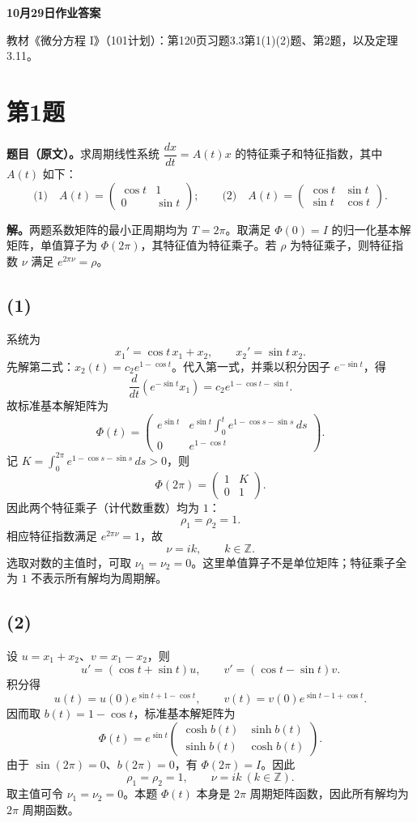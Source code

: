 \documentclass[11pt,a4paper]{ctexart}
\begin{document}
\begin{center}\LARGE\bfseries 10月29日作业答案\end{center}
教材《微分方程 I》（101计划）：第120页习题3.3第1(1)(2)题、第2题，以及定理3.11。

\section*{第1题}
\textbf{题目（原文）。}求周期线性系统 $\dfrac{dx}{dt}=A(t)x$ 的特征乘子和特征指数，其中 $A(t)$ 如下：
\[
\text{(1)}\quad A(t)=\begin{pmatrix}\cos t&1\\0&\sin t\end{pmatrix};
\qquad
\text{(2)}\quad A(t)=\begin{pmatrix}\cos t&\sin t\\\sin t&\cos t\end{pmatrix}.
\]

\textbf{解。}两题系数矩阵的最小正周期均为 $T=2\pi$。取满足 $\Phi(0)=I$ 的归一化基本解矩阵，单值算子为 $\Phi(2\pi)$，其特征值为特征乘子。若 $\rho$ 为特征乘子，则特征指数 $\nu$ 满足 $e^{2\pi\nu}=\rho$。

\subsection*{(1)}
系统为
\[
x_1'=\cos t\,x_1+x_2,\qquad x_2'=\sin t\,x_2.
\]
先解第二式：$x_2(t)=c_2e^{1-\cos t}$。代入第一式，并乘以积分因子 $e^{-\sin t}$，得
\[
\frac{d}{dt}(e^{-\sin t}x_1)
=c_2e^{1-\cos t-\sin t}.
\]
故标准基本解矩阵为
\[
\Phi(t)=\begin{pmatrix}
e^{\sin t}&e^{\sin t}\displaystyle\int_0^t e^{1-\cos s-\sin s}\,ds\\
0&e^{1-\cos t}
\end{pmatrix}.
\]
记 $K=\displaystyle\int_0^{2\pi}e^{1-\cos s-\sin s}\,ds>0$，则
\[
\Phi(2\pi)=\begin{pmatrix}1&K\\0&1\end{pmatrix}.
\]
因此两个特征乘子（计代数重数）均为 $1$：
\[
\boxed{\rho_1=\rho_2=1.}
\]
相应特征指数满足 $e^{2\pi\nu}=1$，故
\[
\boxed{\nu=ik,\qquad k\in\mathbb Z.}
\]
选取对数的主值时，可取 $\nu_1=\nu_2=0$。这里单值算子不是单位矩阵；特征乘子全为 $1$ 不表示所有解均为周期解。

\subsection*{(2)}
设 $u=x_1+x_2$、$v=x_1-x_2$，则
\[
u'=(\cos t+\sin t)u,\qquad v'=(\cos t-\sin t)v.
\]
积分得
\[
u(t)=u(0)e^{\sin t+1-\cos t},\qquad
v(t)=v(0)e^{\sin t-1+\cos t}.
\]
因而取 $b(t)=1-\cos t$，标准基本解矩阵为
\[
\Phi(t)=e^{\sin t}\begin{pmatrix}
\cosh b(t)&\sinh b(t)\\
\sinh b(t)&\cosh b(t)
\end{pmatrix}.
\]
由于 $\sin(2\pi)=0$、$b(2\pi)=0$，有 $\Phi(2\pi)=I$。因此
\[
\boxed{\rho_1=\rho_2=1,\qquad \nu=ik\ (k\in\mathbb Z).}
\]
取主值可令 $\nu_1=\nu_2=0$。本题 $\Phi(t)$ 本身是 $2\pi$ 周期矩阵函数，因此所有解均为 $2\pi$ 周期函数。
\end{document}
